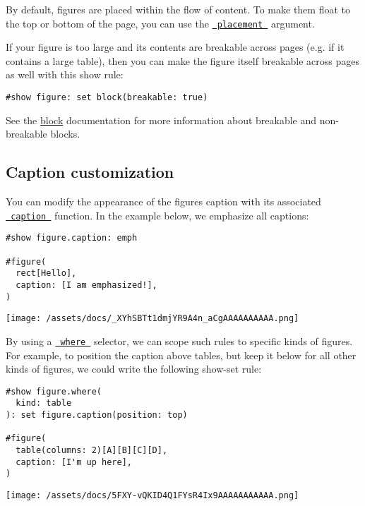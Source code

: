 By default, figures are placed within the flow of content. To make them
float to the top or bottom of the page, you can use the
\href{/docs/reference/model/figure/\#parameters-placement}{\texttt{\ placement\ }}
argument.

If your figure is too large and its contents are breakable across pages
(e.g. if it contains a large table), then you can make the figure itself
breakable across pages as well with this show rule:

\begin{verbatim}
#show figure: set block(breakable: true)
\end{verbatim}

See the
\href{/docs/reference/layout/block/\#parameters-breakable}{block}
documentation for more information about breakable and non-breakable
blocks.

\subsection{Caption customization}\label{caption-customization}

You can modify the appearance of the figure\textquotesingle s caption
with its associated
\href{/docs/reference/model/figure/\#definitions-caption}{\texttt{\ caption\ }}
function. In the example below, we emphasize all captions:

\begin{verbatim}
#show figure.caption: emph

#figure(
  rect[Hello],
  caption: [I am emphasized!],
)
\end{verbatim}

\texttt{[image: /assets/docs/\_XYhSBTt1dmjYR9A4n\_aCgAAAAAAAAAA.png]}

By using a
\href{/docs/reference/foundations/function/\#definitions-where}{\texttt{\ where\ }}
selector, we can scope such rules to specific kinds of figures. For
example, to position the caption above tables, but keep it below for all
other kinds of figures, we could write the following show-set rule:

\begin{verbatim}
#show figure.where(
  kind: table
): set figure.caption(position: top)

#figure(
  table(columns: 2)[A][B][C][D],
  caption: [I'm up here],
)
\end{verbatim}

\texttt{[image: /assets/docs/5FXY-vQKID4Q1FYsR4Ix9AAAAAAAAAAA.png]}

